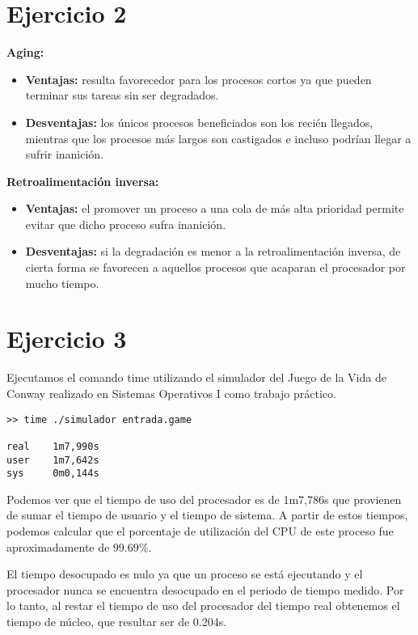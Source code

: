 \documentclass[11pt]{article}
\begin{document}
\section*{Ejercicio 2}

\textbf{Aging:}

\begin{itemize}
    \item \textbf{Ventajas:} resulta favorecedor para los procesos cortos ya que
          pueden terminar sus tareas sin ser degradados.
    \item \textbf{Desventajas:} los únicos procesos beneficiados son los recién llegados,
          mientras que los procesos más largos son castigados e incluso podrían llegar
          a sufrir inanición.
\end{itemize}

\textbf{Retroalimentación inversa:}

\begin{itemize}
    \item \textbf{Ventajas:} el promover un proceso a una cola de más alta prioridad
          permite evitar que dicho proceso sufra inanición.
    \item \textbf{Desventajas:} si la degradación es menor a la retroalimentación inversa,
          de cierta forma se favorecen a aquellos procesos que acaparan el procesador por 
          mucho tiempo.
\end{itemize}

\section*{Ejercicio 3}

Ejecutamos el comando time utilizando el simulador del Juego de la Vida de Conway
realizado en Sistemas Operativos I como trabajo práctico.

\begin{verbatim}
>> time ./simulador entrada.game

real    1m7,990s
user    1m7,642s
sys     0m0,144s
\end{verbatim}

Podemos ver que el tiempo de uso del procesador es de 1m7,786s que provienen
de sumar el tiempo de usuario y el tiempo de sistema. A partir de estos tiempos,
podemos calcular que el porcentaje de utilización del CPU de este proceso
fue aproximadamente de 99.69\%.

El tiempo desocupado es nulo ya que un proceso se está ejecutando y el procesador
nunca se encuentra desocupado en el periodo de tiempo medido. Por lo tanto,
al restar el tiempo de uso del procesador del tiempo real obtenemos el tiempo
de núcleo, que resultar ser de 0.204s.
\end{document}
